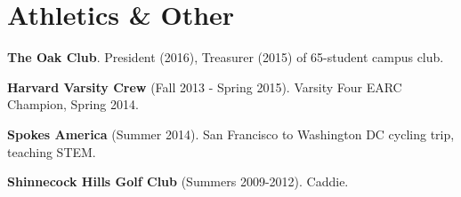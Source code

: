 \documentclass[letterpaper]{amsart}
\def\footerlink{}
\renewenvironment{itemize}{
  \begin{list}{}{
    \setlength{\leftmargin}{1.5em}
  }
}{
  \end{list}
}
\begin{document}
\section*{Athletics \& Other}
\begin{itemize}
\item \textbf{The Oak Club}. President (2016), Treasurer (2015) of 65-student campus club.
\item \textbf{Harvard Varsity Crew} (Fall 2013 - Spring 2015). Varsity Four EARC Champion, Spring 2014.
\item \textbf{Spokes America} (Summer 2014). San Francisco to Washington DC cycling trip, teaching STEM.
\item \textbf{Shinnecock Hills Golf Club} (Summers 2009-2012). Caddie. 
\end{itemize}

\bigskip

\end{document}
